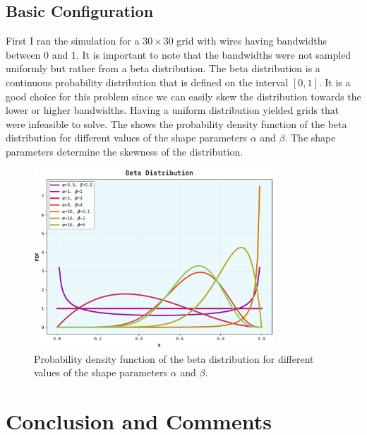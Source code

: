 \documentclass[10pt, titlepage, a4paper]{article}
\begin{document}
\subsection{Basic Configuration}
First I ran the simulation for a $30\times 30$ grid with wires having bandwidths between $0$ and $1$. It is important to note 
that the bandwidths were not sampled uniformly but rather from a beta distribution. The beta distribution is a 
continuous probability distribution that is defined on the interval $[0, 1]$. It is a good choice for this problem
since we can easily skew the distribution towards the lower or higher bandwidths. Having a uniform distribution yielded 
grids that were infeasible to solve. The \textcolor{red}{} shows the probability density function
of the beta distribution for different values of the shape parameters $\alpha$ and $\beta$. The shape parameters determine
the skewness of the distribution. 

\begin{figure}[H]
    \centering
    \includegraphics[width=0.8\textwidth]{../Images/beta_dist.pdf}
    \caption{Probability density function of the beta distribution for different values of the shape parameters $\alpha$ and $\beta$.}
    \label{fig:beta_dist}
\end{figure}




\section{Conclusion and Comments}

% 
% 

\end{document}
